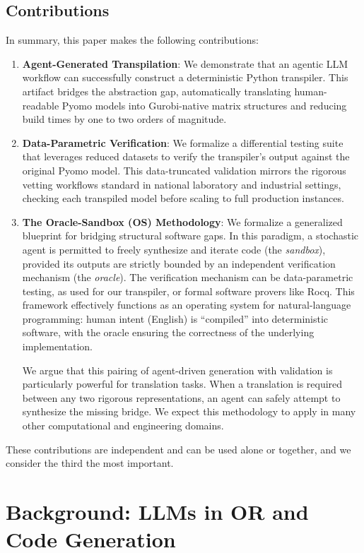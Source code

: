 \documentclass[runningheads]{llncs}
\begin{document}
\subsection{Contributions} 
In summary, this paper makes the following contributions:
\begin{enumerate}
    \item \textbf{Agent-Generated Transpilation}: We demonstrate that an agentic LLM workflow can successfully construct a deterministic Python transpiler. This artifact bridges the abstraction gap, automatically translating human-readable Pyomo models into Gurobi-native matrix structures and reducing build times by one to two orders of magnitude.
    \item \textbf{Data-Parametric Verification}: We formalize a differential testing suite that leverages reduced datasets to verify the transpiler's output against the original Pyomo model. This data-truncated validation mirrors the rigorous vetting workflows standard in national laboratory and industrial settings, checking each transpiled model before scaling to full production instances.
    \item \textbf{The Oracle-Sandbox (OS) Methodology}: We formalize a generalized blueprint for bridging structural software gaps. In this paradigm, a stochastic agent is permitted to freely synthesize and iterate code (the \emph{sandbox}), provided its outputs are strictly bounded by an independent verification mechanism (the \emph{oracle}). The verification mechanism can be data-parametric testing, as used for our transpiler, or formal software provers like Rocq. This framework effectively functions as an operating system for natural-language programming: human intent (English) is ``compiled'' into deterministic software, with the oracle ensuring the correctness of the underlying implementation.
    
    We argue that this pairing of agent-driven generation with validation is particularly powerful for translation tasks. When a translation is required between any two rigorous representations, an agent can safely attempt to synthesize the missing bridge. We expect this methodology to apply in many other computational and engineering domains.
\end{enumerate}
These contributions are independent and can be used alone or together, and we consider the third the most important.

\section{Background: LLMs in OR and Code Generation}
\end{document}
